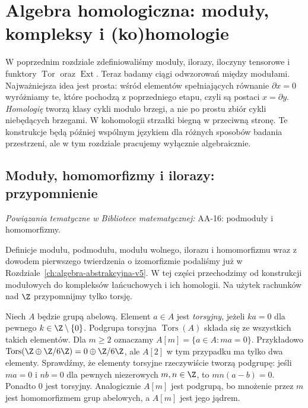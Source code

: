 \chapter{Algebra homologiczna: moduły, kompleksy i (ko)homologie}
\label{ch:algebra-homologiczna}

\providecommand{\atlasref}[2]{#2}


W poprzednim rozdziale zdefiniowaliśmy moduły, ilorazy,
iloczyny tensorowe i funktory $\operatorname{Tor}$ oraz $\operatorname{Ext}$.
Teraz badamy ciągi odwzorowań między modułami. Najważniejsza idea
jest prosta: wśród elementów spełniających
równanie $\partial x=0$ wyróżniamy te, które pochodzą z
poprzedniego etapu, czyli są postaci $x=\partial y$.
\emph{Homologię} tworzą klasy cykli modulo brzegi,
a nie po prostu zbiór cykli niebędących brzegami.
W kohomologii strzałki biegną w
przeciwną stronę. Te konstrukcje będą później wspólnym
językiem dla różnych sposobów badania przestrzeni,
ale w tym rozdziale pracujemy wyłącznie algebraicznie.

\section{Moduły, homomorfizmy i ilorazy: przypomnienie}
\label{sec:moduly}

\noindent\emph{Powiązania tematyczne w Bibliotece matematycznej:} \atlasref{AA-16::aa:def:modules-sub-hom}{AA-16: podmoduły i homomorfizmy}.

Definicje modułu, podmodułu, modułu wolnego, ilorazu i homomorfizmu
wraz z dowodem pierwszego twierdzenia o izomorfizmie podaliśmy już
w Rozdziale~\ref{ch:algebra-abstrakcyjna-v5}. W tej części przechodzimy
od konstrukcji modułowych do kompleksów łańcuchowych i ich homologii.
Na użytek rachunków nad $\Z$ przypomnijmy tylko torsję.

\begin{definicja}
\label{def:torsja}
Niech $A$ będzie grupą abelową. Element $a\in A$ jest
\emph{torsyjny}, jeżeli $ka=0$ dla pewnego $k\in\Z\setminus\{0\}$.
Podgrupa torsyjna $\operatorname{Tors}(A)$ składa się ze
wszystkich takich elementów. Dla $m\ge2$ oznaczamy
$A[m]=\{a\in A:ma=0\}$.
Przykładowo $\operatorname{Tors}(\Z\oplus\Z/6\Z)=0\oplus\Z/6\Z$,
ale $A[2]$ w tym przypadku ma tylko dwa elementy.
Sprawdźmy, że elementy torsyjne rzeczywiście tworzą podgrupę:
jeśli $ma=0$ i $nb=0$ dla pewnych niezerowych
$m,n\in\Z$, to $mn(a-b)=0$. Ponadto $0$ jest torsyjny.
Analogicznie $A[m]$ jest podgrupą, bo mnożenie przez $m$
jest homomorfizmem grup abelowych, a $A[m]$ jest jego jądrem.
\end{definicja}

